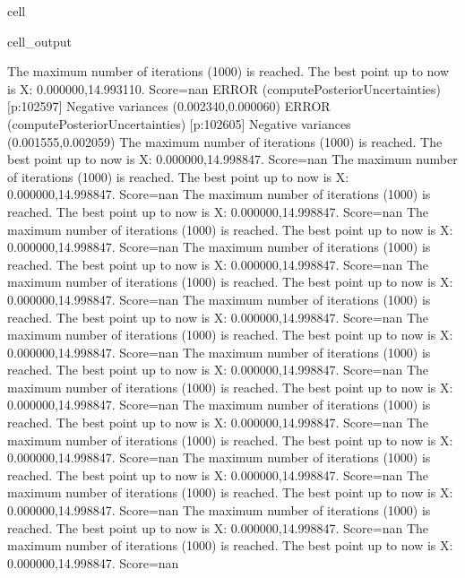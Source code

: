 \documentclass[letterpaper,10pt,english]{jupyterBook}
\begin{document}
\begin{sphinxuseclass}{cell}
\begin{sphinxVerbatimOutput}
\begin{sphinxuseclass}{cell_output}
\begin{sphinxVerbatim}[commandchars=\\\{\}]
The maximum number of iterations (1000) is reached. The best point up to now is X: \PYGZob{}0.000000,14.993110\PYGZcb{}. Score=\PYGZhy{}nan
ERROR (compute\PYGZus{}Posterior\PYGZus{}Uncertainties) [p:102597] Negative variances (0.002340,\PYGZhy{}0.000060)
ERROR (compute\PYGZus{}Posterior\PYGZus{}Uncertainties) [p:102605] Negative variances (\PYGZhy{}0.001555,0.002059)
The maximum number of iterations (1000) is reached. The best point up to now is X: \PYGZob{}0.000000,14.998847\PYGZcb{}. Score=\PYGZhy{}nan
The maximum number of iterations (1000) is reached. The best point up to now is X: \PYGZob{}0.000000,14.998847\PYGZcb{}. Score=\PYGZhy{}nan
The maximum number of iterations (1000) is reached. The best point up to now is X: \PYGZob{}0.000000,14.998847\PYGZcb{}. Score=\PYGZhy{}nan
The maximum number of iterations (1000) is reached. The best point up to now is X: \PYGZob{}0.000000,14.998847\PYGZcb{}. Score=\PYGZhy{}nan
The maximum number of iterations (1000) is reached. The best point up to now is X: \PYGZob{}0.000000,14.998847\PYGZcb{}. Score=\PYGZhy{}nan
The maximum number of iterations (1000) is reached. The best point up to now is X: \PYGZob{}0.000000,14.998847\PYGZcb{}. Score=\PYGZhy{}nan
The maximum number of iterations (1000) is reached. The best point up to now is X: \PYGZob{}0.000000,14.998847\PYGZcb{}. Score=\PYGZhy{}nan
The maximum number of iterations (1000) is reached. The best point up to now is X: \PYGZob{}0.000000,14.998847\PYGZcb{}. Score=\PYGZhy{}nan
The maximum number of iterations (1000) is reached. The best point up to now is X: \PYGZob{}0.000000,14.998847\PYGZcb{}. Score=\PYGZhy{}nan
The maximum number of iterations (1000) is reached. The best point up to now is X: \PYGZob{}0.000000,14.998847\PYGZcb{}. Score=\PYGZhy{}nan
The maximum number of iterations (1000) is reached. The best point up to now is X: \PYGZob{}0.000000,14.998847\PYGZcb{}. Score=\PYGZhy{}nan
The maximum number of iterations (1000) is reached. The best point up to now is X: \PYGZob{}0.000000,14.998847\PYGZcb{}. Score=\PYGZhy{}nan
The maximum number of iterations (1000) is reached. The best point up to now is X: \PYGZob{}0.000000,14.998847\PYGZcb{}. Score=\PYGZhy{}nan
The maximum number of iterations (1000) is reached. The best point up to now is X: \PYGZob{}0.000000,14.998847\PYGZcb{}. Score=\PYGZhy{}nan
The maximum number of iterations (1000) is reached. The best point up to now is X: \PYGZob{}0.000000,14.998847\PYGZcb{}. Score=\PYGZhy{}nan
The maximum number of iterations (1000) is reached. The best point up to now is X: \PYGZob{}0.000000,14.998847\PYGZcb{}. Score=\PYGZhy{}nan

\end{sphinxVerbatim}
\end{sphinxuseclass}
\end{sphinxVerbatimOutput}
\end{sphinxuseclass}
\end{document}
